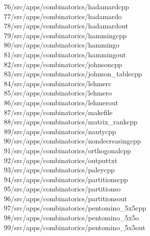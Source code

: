 \begin{tabbing}
76\>/src/apps/combinatorics/hadamardcpp\\[0pt]
77\>/src/apps/combinatorics/hadamardo\\[0pt]
78\>/src/apps/combinatorics/hadamardout\\[0pt]
79\>/src/apps/combinatorics/hammingcpp\\[0pt]
80\>/src/apps/combinatorics/hammingo\\[0pt]
81\>/src/apps/combinatorics/hammingout\\[0pt]
82\>/src/apps/combinatorics/johnsoncpp\\[0pt]
83\>/src/apps/combinatorics/johnson\_tablecpp\\[0pt]
84\>/src/apps/combinatorics/lehmerc\\[0pt]
85\>/src/apps/combinatorics/lehmero\\[0pt]
86\>/src/apps/combinatorics/lehmerout\\[0pt]
87\>/src/apps/combinatorics/makefile\\[0pt]
88\>/src/apps/combinatorics/matrix\_rankcpp\\[0pt]
89\>/src/apps/combinatorics/nautycpp\\[0pt]
90\>/src/apps/combinatorics/nondecreasingcpp\\[0pt]
91\>/src/apps/combinatorics/orthogonalcpp\\[0pt]
92\>/src/apps/combinatorics/outputtxt\\[0pt]
93\>/src/apps/combinatorics/paleycpp\\[0pt]
94\>/src/apps/combinatorics/partitionscpp\\[0pt]
95\>/src/apps/combinatorics/partitionso\\[0pt]
96\>/src/apps/combinatorics/partitionsout\\[0pt]
97\>/src/apps/combinatorics/pentomino\_5x5cpp\\[0pt]
98\>/src/apps/combinatorics/pentomino\_5x5o\\[0pt]
99\>/src/apps/combinatorics/pentomino\_5x5out\\[0pt]

\end{tabbing}

